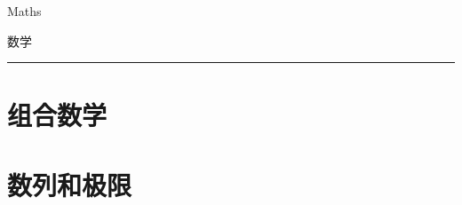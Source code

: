 \documentclass[fontset=none]{ctexbook}
\begin{document}
\sqTurnOffAlerts
{\Huge Maths \par \vspace{1.5em} 数学}

\rule{\textwidth}{1pt}

{\Huge{}}

{\tableofcontents}

\chapter{组合数学}
\chapter{数列和极限}
\end{document}
